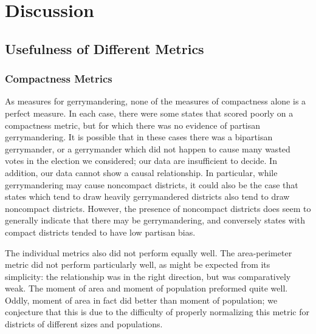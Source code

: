 \documentclass[12pt]{article}
\begin{document}
  \section{Discussion}
  \subsection{Usefulness of Different Metrics}
  \subsubsection{Compactness Metrics}
  As measures for gerrymandering, none of the measures of compactness alone is a perfect measure.  In each case, there were some states that scored poorly on a compactness metric, but for which there was no evidence of partisan gerrymandering.  It is possible that in these cases there was a bipartisan gerrymander, or a gerrymander which did not happen to cause many wasted votes in the election we considered; our data are insufficient to decide.  In addition, our data cannot show a causal relationship.  In particular, while gerrymandering may cause noncompact districts, it could also be the case that states which tend to draw heavily gerrymandered districts also tend to draw noncompact districts.  However, the presence of noncompact districts does seem to generally indicate that there may be gerrymandering, and conversely states with compact districts tended to have low partisan bias.

  The individual metrics also did not perform equally well.  The area-perimeter metric did not perform particularly well, as might be expected from its simplicity: the relationship was in the right direction, but was comparatively weak.  The moment of area and moment of population preformed quite well.  Oddly, moment of area in fact did better than moment of population; we conjecture that this is due to the difficulty of properly normalizing this metric for districts of different sizes and populations.
\end{document}
